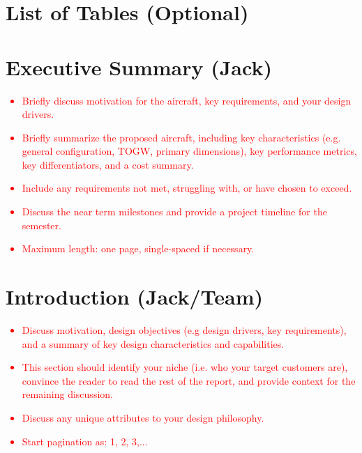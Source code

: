 \documentclass[conf]{new-aiaa}
\begin{document}
\section*{List of Tables (Optional)}

\newpage \setcounter{section}{0}
\section{Executive Summary (Jack)}
\textcolor{red}{
\begin{itemize}
    \item Briefly discuss motivation for the aircraft, key requirements, and your design drivers.
    \item Briefly  summarize the proposed aircraft, including key  characteristics (e.g. general configuration, TOGW, primary dimensions), key performance metrics, key differentiators, and a cost summary.
    \item Include any requirements not met, struggling with, or have chosen to exceed.
    \item Discuss the near term milestones and provide a project timeline for the semester.
    \item Maximum length: one page, single-spaced if necessary.
\end{itemize}}

\section{Introduction (Jack/Team)}
\textcolor{red}{
\begin{itemize}
    \item Discuss motivation, design objectives (e.g design drivers, key requirements), and a summary of key design characteristics and capabilities.
    \item This section should identify your niche (i.e. who your target customers are), convince the reader to read the rest of the report, and provide context for the remaining discussion.
    \item Discuss any unique attributes to your design philosophy.
    \item Start pagination as: 1, 2, 3,...
\end{itemize}}
\end{document}
